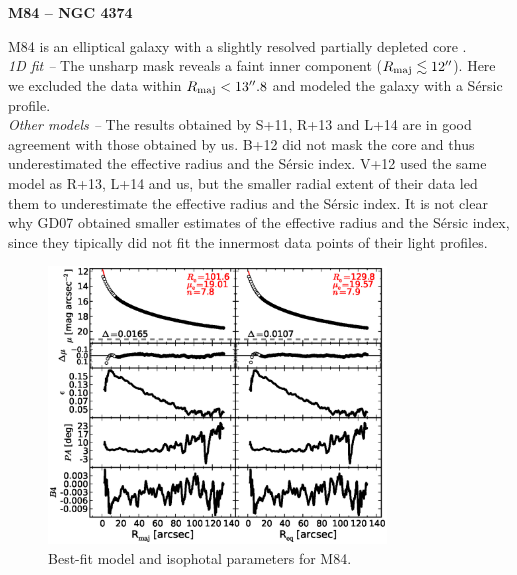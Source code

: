 \documentclass[preprint2]{emulateapj}
\newcommand{\fitfigurewidth}{0.8\textwidth}
\begin{document}
  \clearpage\newpage\noindent
  {\bf M84 -- NGC 4374 \\}

  M84 is an elliptical galaxy with a slightly resolved partially depleted core \citep{rusli2013}.\\ %

  \emph{1D fit -- }
  The unsharp mask reveals a faint inner component ($R_{\rm maj} \lesssim 12''$). 
  Here we excluded the data within $R_{\rm maj} < 13''.8$ and modeled the galaxy with a S\'ersic profile.\\
  
  \emph{Other models -- } 
  The results obtained by S+11, R+13 and L+14 are in good agreement with those obtained by us. 
  B+12 did not mask the core and thus underestimated the effective radius and the S\'ersic index. 
  V+12 used the same model as R+13, L+14 and us, 
  but the smaller radial extent of their data led them to underestimate the effective radius and the S\'ersic index.
  It is not clear why GD07 obtained smaller estimates of the effective radius and the S\'ersic index, 
  since they tipically did not fit the innermost data points of their light profiles. 
    

  \begin{figure}[h]
  \begin{center}
  \includegraphics[width=\fitfigurewidth]{images/m84_1Dfit.eps}
  \caption{Best-fit model and isophotal parameters for M84.}
  \end{center}
  \end{figure}
\end{document}

